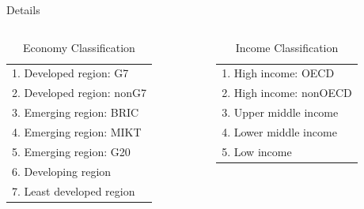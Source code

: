 \documentclass{beamer}
\begin{document}
\begin{frame}[fragile]{Details}
\vspace{-.3in}
		\begin{scriptsize}
		\begin{columns}[T]
		\begin{column}{0.5\textwidth}
			\begin{table}
			\caption{Economy Classification}
			\begin{tabular}{l}
				1. Developed region: G7\\ 
				2. Developed region: nonG7\\ 
				3. Emerging region: BRIC\\ 
				4. Emerging region: MIKT\\ 
				5. Emerging region: G20\\ 
				6. Developing region\\ 
				7. Least developed region\\		
			\end{tabular}
			\end{table}
		\end{column}
		\begin{column}{0.5\textwidth}
			\begin{table}
			\caption{Income Classification}
			\begin{tabular}{l}
					1. High income: OECD\\ 
					2. High income: nonOECD\\ 
					3. Upper middle income\\ 
					4. Lower middle income\\ 
					5. Low income
			\end{tabular}
			\end{table}
		\end{column}
		\end{columns}
		
		

\end{scriptsize}
\end{frame}
\end{document}
